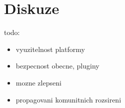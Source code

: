 \chapter{Diskuze}

todo\todo:

\begin{itemize}
    \item vyuzitelnost platformy
    \item bezpecnost obecne, pluginy
    \item mozne zlepseni
    \item propagovani komunitnich rozsireni
\end{itemize}